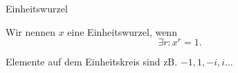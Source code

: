 \documentclass[class=article, crop=false]{standalone}
\begin{document}
\begin{zettel}{Einheitswurzel}
\begin{flashcard}
    \begin{definition}[Einheitswurzel]
        Wir nennen $x$ eine Einheitswurzel, wenn
        \[
            \exists r : x^r = 1
        .\]
    \end{definition}
    \begin{example}[Einheitswurzeln]
        Elemente auf dem Einheitskreis sind zB. $-1,1,-i,i \dots$ 
    \end{example}

\end{flashcard}
\end{zettel}
\end{document}
